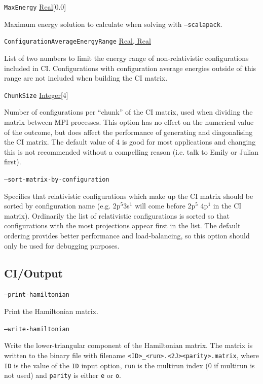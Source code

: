 \documentclass{report}
\begin{document}
\texttt{MaxEnergy} \uline{Real}[0.0]
\begin{adjustwidth}{1cm}{}
Maximum energy solution to calculate when solving with \texttt{--scalapack}.
\end{adjustwidth}

\texttt{ConfigurationAverageEnergyRange} \uline{Real, Real}
\begin{adjustwidth}{1cm}{}
List of two numbers to limit the energy range of non-relativistic configurations included in CI.
Configurations with configuration average energies outside of this range are not included when building
the CI matrix.
\end{adjustwidth}

\texttt{ChunkSize} \uline{Integer}[4]
\begin{adjustwidth}{1cm}{}
Number of configurations per ``chunk'' of the CI matrix, used when dividing the matrix between MPI
processes. This option has no effect on the numerical 
value of the outcome, but does affect the performance of generating and diagonalising the CI matrix. 
The default value of 4 is good for most applications and changing this is not recommended without a 
compelling reason (i.e. talk to Emily or Julian first).
\end{adjustwidth}

\texttt{--sort-matrix-by-configuration}
\begin{adjustwidth}{1cm}{}
Specifies that relativistic configurations which make up the CI matrix should be sorted by configuration
name (e.g. 2p$^5$3s$^1$ will come before 2p$^5$ 4p$^1$ in the CI matrix). Ordinarily the list of
relativistic configurations is sorted so that configurations with the most projections appear first in
the list. The default ordering provides better performance and load-balancing, so this option should
only be used for debugging purposes.
\end{adjustwidth}

\subsection{CI/Output}

\texttt{--print-hamiltonian}
\begin{adjustwidth}{1cm}{}
Print the Hamiltonian matrix. 
\end{adjustwidth}

\texttt{--write-hamiltonian}
\begin{adjustwidth}{1cm}{}
Write the lower-triangular component of the Hamiltonian matrix. The matrix is written to the binary file
with filename \texttt{<ID>\_<run>.<2J><parity>.matrix}, where \texttt{ID} is the value of the 
\texttt{ID} input option, \texttt{run} is the multirun index (0 if multirun is not used) and
\texttt{parity} is either \texttt{e} or \texttt{o}.
\end{adjustwidth}
\end{document}
